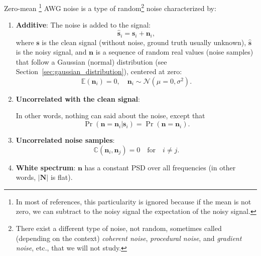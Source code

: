 Zero-mean \footnote{In most of references, this particularity is
  ignored because if the mean is not zero, we can subtract to the
  noisy signal the expectation of the noisy signal.} \gls{AWG} noise
is a type of random\footnote{There exist a different type of noise,
  not random, sometimes called (depending on the context)
  \emph{coherent noise}, \emph{procedural noise}, and \emph{gradient
    noise}, etc., that we will not study.} noise characterized by:
\begin{enumerate}

\item \textbf{Additive}: The noise is added to the signal:
  \begin{equation}
    \hat{\mathbf{s}}_i = {\mathbf{s}}_i + {\mathbf{n}}_i,
    \label{eq:AWG_i}
  \end{equation}
  where $\mathbf{s}$ is the clean signal (without noise, ground truth
  usually unknown), $\hat{\mathbf{s}}$ is the noisy signal, and
  ${\mathbf{n}}$ is a sequence of random real values (noise samples)
  that follow a Gaussian (normal) distribution (see
  Section~\ref{sec:gaussian_distribution}), centered at zero:
  \begin{equation} 
    \mathbb{E}(\mathbf{n}_i) = 0,\quad {\mathbf n}_i\sim{\mathcal N}(\mu=0,\sigma^2).
  \end{equation}

\item \textbf{Uncorrelated with the clean signal}: %
\begin{comment}
\end{comment}
  In other words, nothing can said about the noise, except that
  \begin{equation}
    \Pr(\mathbf{n}{=}\mathbf{n}_i|\mathbf{s}_i) = \Pr(\mathbf{n}{=}\mathbf{n}_i).
  \end{equation}
\begin{comment}
  Moreover, because $\mathbf{s}$ is unknown, 
  \begin{equation}
    \Pr(\mathbf{n}{=}\mathbf{n}_i|\hat{\mathbf{s}}_i) = \Pr(\mathbf{n}{=}\mathbf{n}_i).
  \end{equation}
\end{comment}

\item \textbf{Uncorrelated noise samples}:
  \begin{equation}
    \mathbb{C}(\mathbf{n}_i,\mathbf{n}_j) = 0 \quad \text{for} \quad i\neq j.
  \end{equation}
  
\item \textbf{White spectrum}: $\mathbf{n}$ has a constant \gls{PSD} over all frequencies (in
  other words, $|\mathbf{N}|$ is flat).
  
\end{enumerate}

